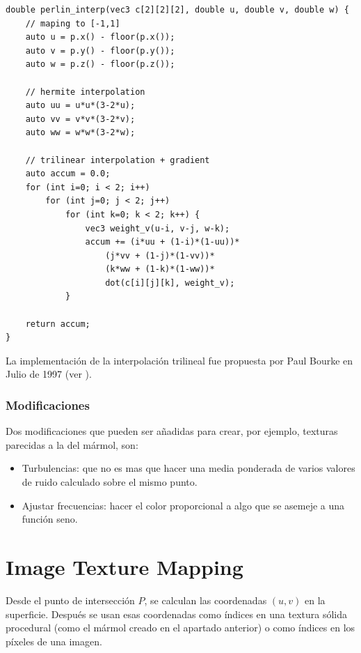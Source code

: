 \documentclass[12pt]{article}
\theoremstyle{definition}
\theoremstyle{remark}
\begin{document}
\begin{lstlisting}[basicstyle=\footnotesize]
double perlin_interp(vec3 c[2][2][2], double u, double v, double w) {
    // maping to [-1,1]
    auto u = p.x() - floor(p.x());
    auto v = p.y() - floor(p.y());
    auto w = p.z() - floor(p.z());
    
    // hermite interpolation
    auto uu = u*u*(3-2*u);
    auto vv = v*v*(3-2*v);
    auto ww = w*w*(3-2*w);
    
    // trilinear interpolation + gradient
    auto accum = 0.0;
    for (int i=0; i < 2; i++)
        for (int j=0; j < 2; j++)
            for (int k=0; k < 2; k++) {
                vec3 weight_v(u-i, v-j, w-k);
                accum += (i*uu + (1-i)*(1-uu))*
                    (j*vv + (1-j)*(1-vv))*
                    (k*ww + (1-k)*(1-ww))*
                    dot(c[i][j][k], weight_v);
            }

    return accum;
}
\end{lstlisting}

La implementación de la interpolación trilineal fue propuesta por Paul Bourke en Julio de 1997 (ver \cite{paulbourke}).

\subsubsection{Modificaciones}

Dos modificaciones que pueden ser añadidas para crear, por ejemplo, texturas parecidas a la del mármol, son:

\begin{itemize}
\item Turbulencias: que no es mas que hacer una media ponderada de varios valores de ruido calculado sobre el mismo punto.
\item Ajustar frecuencias: hacer el color proporcional a algo que se asemeje a una función seno.
\end{itemize}

\section{Image Texture Mapping}

Desde el punto de intersección $P$, se calculan las coordenadas $(u,v)$ en la superficie. Después se usan esas coordenadas como índices en una textura sólida procedural (como el mármol creado en el apartado anterior) o como índices en los píxeles de una imagen.
\end{document}
